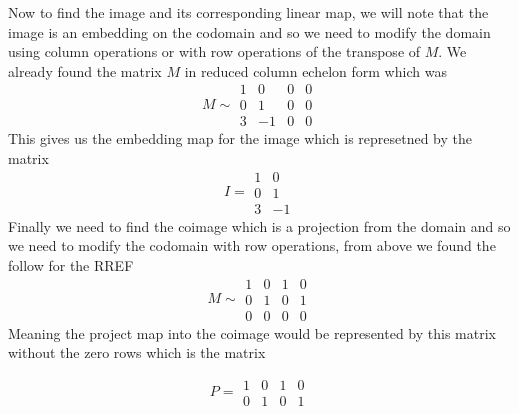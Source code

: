 \documentclass[12pt]{amsart}
\theoremstyle{definition}
\begin{document}
\begin{enumerate}
Now to find the image and its corresponding linear map, we will note that the image is an embedding on the codomain and so we need to modify the domain using column operations or with row operations of the transpose of $M$. We already found the matrix $M$ in reduced column echelon form which was 
$$M\sim \boxed{\begin{matrix}
1 & 0 & 0 & 0 \\
0 & 1 & 0 & 0\\
3 & -1 & 0 & 0
\end{matrix}}$$
This gives us the embedding map for the image which is represetned by the matrix 
$$I=\boxed{\begin{matrix}
1 & 0 \\
0 & 1\\
3 & -1
\end{matrix}}$$
Finally we need to find the coimage which is a projection from the domain and so we need to modify the codomain with row operations, from above we found the follow for the RREF
$$M\sim \boxed{\begin{matrix}
1 & 0 & 1 & 0\\
0 & 1 & 0 & 1 \\
0 & 0 & 0 & 0
\end{matrix}}$$
Meaning the project map into the coimage would be represented by this matrix without the zero rows which is the matrix

$$P=\boxed{\begin{matrix}
1 & 0 & 1 & 0\\
0 & 1 & 0 & 1
\end{matrix}}$$\\


\end{enumerate}
\end{document}
